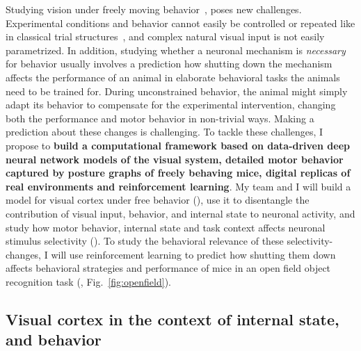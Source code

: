 \documentclass[B2,COG]{ercgrant}
\begin{document}
Studying vision under freely moving behavior~\parencite{Parker2022-ac}, poses new challenges. 
Experimental conditions and behavior cannot easily be controlled or repeated like in classical trial structures~\parencite{Huk2018-ez}, and complex natural visual input is not easily parametrized. 
In addition, studying whether a neuronal mechanism is \textit{necessary} for  behavior usually involves a prediction how shutting down the mechanism affects the performance of an animal in elaborate behavioral tasks the animals need to be trained for.
During unconstrained behavior, the animal might simply adapt its behavior to compensate for the experimental intervention, changing both the performance and motor behavior in non-trivial ways.  
Making a prediction about these changes is challenging.
To tackle these challenges, I propose to \textbf{build a computational framework based on data-driven deep neural network models of the visual system, detailed motor behavior captured by posture graphs of freely behaving mice, digital replicas of real environments and reinforcement learning}.
My team and I will build a model for visual cortex under free behavior (), use it to disentangle the contribution of visual input, behavior, and internal state to neuronal activity, and study how motor behavior, internal state and task context affects neuronal stimulus selectivity (). To study the behavioral relevance of these selectivity-changes, I will use reinforcement learning to predict how shutting them down affects behavioral strategies and performance of mice in an open field object recognition task  (, Fig.~\ref{fig:openfield}).


\subsection{Visual cortex in the context of internal state, and behavior}
\end{document}
